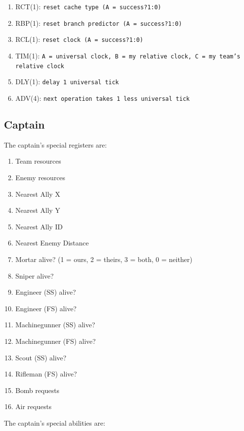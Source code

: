 \documentclass{article}
\begin{document}
\begin{enumerate}[noitemsep]
    \item RCT(1): \texttt{reset cache type (A = success?1:0)}
    \item RBP(1): \texttt{reset branch predictor (A = success?1:0)}
    \item RCL(1): \texttt{reset clock (A = success?1:0)}
    \item TIM(1): \texttt{A = universal clock, B = my relative clock, C = my
        team's relative clock}
    \item DLY(1): \texttt{delay 1 universal tick}
    \item ADV(4): \texttt{next operation takes 1 less universal tick}
\end{enumerate}

\subsection*{Captain}

The captain's special registers are:

\begin{enumerate}[noitemsep]
    \item Team resources
    \item Enemy resources
    \item Nearest Ally X
    \item Nearest Ally Y
    \item Nearest Ally ID
    \item Nearest Enemy Distance
    \item Mortar alive? (1 = ours, 2 = theirs, 3 = both, 0 = neither)
    \item Sniper alive?
    \item Engineer (SS) alive?
    \item Engineer (FS) alive?
    \item Machinegunner (SS) alive?
    \item Machinegunner (FS) alive?
    \item Scout (SS) alive?
    \item Rifleman (FS) alive?
    \item Bomb requests
    \item Air requests
\end{enumerate}

The captain's special abilities are:
\end{document}
